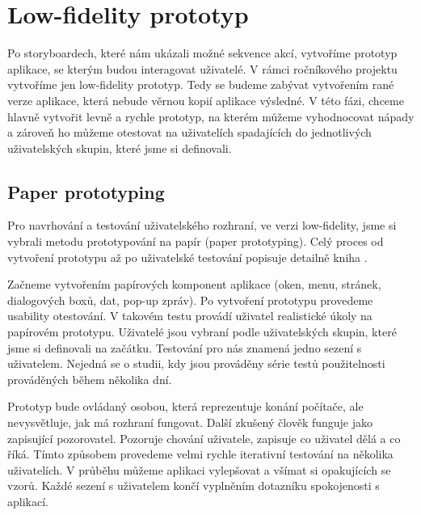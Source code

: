 \chapter{Low-fidelity prototyp}



Po storyboardech, které nám ukázali možné sekvence akcí, vytvoříme prototyp aplikace, se kterým budou interagovat uživatelé. V rámci ročníkového projektu vytvoříme jen low-fidelity prototyp. Tedy se budeme zabývat vytvořením rané verze aplikace, která nebude věrnou kopií aplikace výsledné. V této fázi, chceme hlavně vytvořit levně a rychle prototyp, na kterém můžeme vyhodnocovat nápady a zároveň ho můžeme otestovat na uživatelích spadajících do jednotlivých uživatelských skupin, které jsme si definovali.

\section{Paper prototyping}

Pro navrhování a testování uživatelského rozhraní, ve verzi low-fidelity, jsme si vybrali metodu prototypování na papír (paper prototyping). Celý proces od vytvoření prototypu až po uživatelské testování popisuje detailně kniha \cite{Paper_Prototyping}.

Začneme vytvořením papírových komponent aplikace (oken, menu, stránek, dialogových boxů, dat, pop-up zpráv). 
Po vytvoření prototypu provedeme usability otestování.
V takovém testu provádí uživatel realistické úkoly na papírovém prototypu. Uživatelé jsou vybraní podle uživatelských skupin, které jsme si definovali na začátku.
Testování pro nás znamená jedno sezení s uživatelem. Nejedná se o studii, kdy jsou prováděny série testů použitelnosti prováděných během několika dní.


Prototyp bude ovládaný osobou, která reprezentuje konání počítače, ale nevysvětluje, jak má rozhraní fungovat. Další zkušený člověk funguje jako zapisující pozorovatel. Pozoruje chování uživatele, zapisuje co uživatel dělá a co říká. Tímto způsobem provedeme velmi rychle iterativní testování na několika uživatelích. V průběhu můžeme aplikaci vylepšovat a všímat si opakujících se vzorů. Každé sezení s uživatelem končí vyplněním dotazníku spokojenosti s aplikací.

